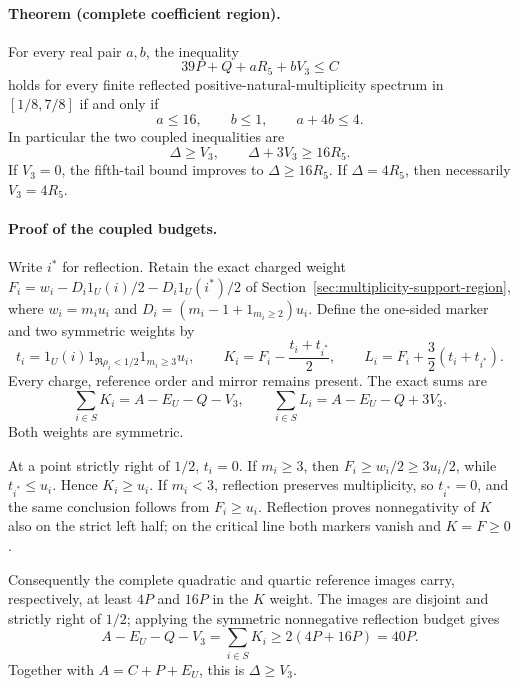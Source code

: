 \paragraph{Theorem (complete coefficient region).}
For every real pair \(a,b\), the inequality
\begin{equation}\label{eq:two-tail-region}
 39P+Q+aR_5+bV_3\le C
\end{equation}
holds for every finite reflected positive-natural-multiplicity spectrum
in \([1/8,7/8]\) if and only if
\begin{equation}\label{eq:two-tail-facets}
 \boxed{\quad a\le16,\qquad b\le1,\qquad a+4b\le4.\quad}
\end{equation}
In particular the two coupled inequalities are
\begin{equation}\label{eq:two-tail-budgets}
 \Delta\ge V_3,\qquad \Delta+3V_3\ge16R_5.
\end{equation}
If \(V_3=0\), the fifth-tail bound improves to \(\Delta\ge16R_5\).
If \(\Delta=4R_5\), then necessarily \(V_3=4R_5\).

\paragraph{Proof of the coupled budgets.}
Write \(i^*\) for reflection. Retain the exact charged weight
\(F_i=w_i-D_i1_U(i)/2-D_i1_U(i^*)/2\) of
Section~\ref{sec:multiplicity-support-region}, where
\(w_i=m_i u_i\) and \(D_i=(m_i-1+1_{m_i\ge2})u_i\).
Define the one-sided marker and two symmetric weights by
\[
 t_i=1_U(i)1_{\Re\rho_i<1/2}1_{m_i\ge3}u_i,\qquad
 K_i=F_i-\frac{t_i+t_{i^*}}2,\qquad
 L_i=F_i+\frac32(t_i+t_{i^*}).
\]
Every charge, reference order and mirror remains present. The exact sums are
\[
 \sum_{i\in S}K_i=A-E_U-Q-V_3,\qquad
 \sum_{i\in S}L_i=A-E_U-Q+3V_3.
\]
Both weights are symmetric.

At a point strictly right of \(1/2\), \(t_i=0\).
If \(m_i\ge3\), then
\(F_i\ge w_i/2\ge3u_i/2\), while \(t_{i^*}\le u_i\).
Hence \(K_i\ge u_i\). If \(m_i<3\), reflection preserves multiplicity,
so \(t_{i^*}=0\), and the same conclusion follows from \(F_i\ge u_i\).
Reflection proves nonnegativity of \(K\) also on the strict left half;
on the critical line both markers vanish and \(K=F\ge0\).

Consequently the complete quadratic and quartic reference images carry,
respectively, at least \(4P\) and \(16P\) in the \(K\) weight.
The images are disjoint and strictly right of \(1/2\); applying the
symmetric nonnegative reflection budget gives
\[
 A-E_U-Q-V_3=\sum_{i\in S}K_i\ge2(4P+16P)=40P.
\]
Together with \(A=C+P+E_U\), this is \(\Delta\ge V_3\).


